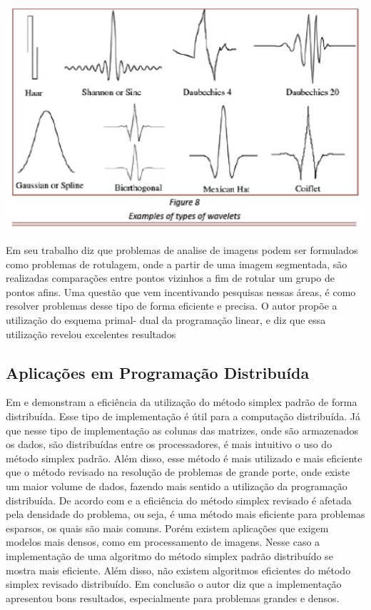 \begin{center}
	\includegraphics[scale=1.00]{graficos/ondaletas}
 	\cite{FotoWave}
\end{center}

Em seu trabalho  diz que problemas de analise de imagens podem ser formulados como problemas de rotulagem, onde a partir de uma imagem segmentada, são realizadas comparações entre pontos vizinhos a fim de rotular um grupo de pontos afins. Uma questão que vem incentivando pesquisas nessas áreas, é como resolver problemas desse tipo de forma eficiente e precisa. O autor propõe a utilização do esquema primal- dual da programação linear, e diz que essa utilização revelou excelentes resultados

\subsection{Aplicações em Programação Distribuída}
Em  e  demonstram a eficiência da utilização do método simplex padrão de forma distribuída. Esse tipo de implementação é útil para a computação distribuída. Já que nesse tipo de implementação as colunas das matrizes, onde são armazenados os dados, são distribuídas entre os processadores, é mais intuitivo o uso do método simplex padrão. Além disso, esse método é mais utilizado e mais eficiente que o método revisado na resolução de problemas de grande porte, onde existe um maior volume de dados, fazendo mais sentido a utilização da programação distribuída.
De acordo com  e  a eficiência do método simplex revisado é afetada pela densidade do problema, ou seja, é uma método mais eficiente para problemas esparsos, os quais são mais comuns. Porém existem aplicações que exigem modelos mais densos, como em processamento de imagens. Nesse caso a implementação de uma algoritmo do método simplex padrão distribuído se mostra mais eficiente. Além disso, não existem algoritmos eficientes do método simplex revisado distribuído. Em conclusão o autor diz que a implementação apresentou bons resultados, especialmente para problemas grandes e densos.

